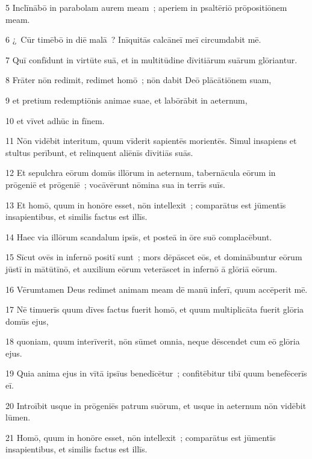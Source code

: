 \psalmVerse
  {\phantom{00}5}
  {Inclīnābō in parabolam aurem meam~; aperiem in psaltēriō prōpositiōnem meam.}


\psalmVerse
  {\phantom{00}6}
  {¿~Cūr timēbō in diē malā~? Inīquitās calcāneī meī circumdabit mē.}


\psalmVerse
  {\phantom{00}7}
  {Quī confīdunt in virtūte suā, et in multitūdine dīvitiārum suārum glōriantur.}


\psalmVerse
  {\phantom{00}8}
  {Frāter nōn redimit, redimet homō~; nōn dabit Deō plācātiōnem suam,}


\psalmVerse
  {\phantom{00}9}
  {et pretium redemptiōnis animae suae, et labōrābit in aeternum,}


\psalmVerse
  {\phantom{0}10}
  {et vīvet adhūc in fīnem.}


\psalmVerse
  {\phantom{0}11}
  {Nōn vidēbit interitum, quum vīderit sapientēs morientēs. Simul insapiens et stultus perībunt, et relinquent aliēnīs dīvitiās suās.}


\psalmVerse
  {\phantom{0}12}
  {Et sepulchra eōrum domūs illōrum in aeternum, tabernācula eōrum in prōgeniē et prōgeniē~; vocāvērunt nōmina sua in terrīs suīs.}


\psalmVerse
  {\phantom{0}13}
  {Et homō, quum in honōre esset, nōn intellexit~; comparātus est jūmentīs insapientibus, et similis factus est illīs.}


\psalmVerse
  {\phantom{0}14}
  {Haec via illōrum scandalum ipsīs, et posteā in ōre suō complacēbunt.}


\psalmVerse
  {\phantom{0}15}
  {Sīcut ovēs in infernō positī sunt~; mors dēpāscet eōs, et dominābuntur eōrum jūstī in mātūtīnō, et auxilium eōrum veterāscet in infernō ā glōriā eōrum.}


\psalmVerse
  {\phantom{0}16}
  {Vērumtamen Deus redimet animam meam dē manū inferī, quum accēperit mē.}


\psalmVerse
  {\phantom{0}17}
  {Nē timuerīs quum dīves factus fuerit homō, et quum multiplicāta fuerit glōria domūs ejus,}


\psalmVerse
  {\phantom{0}18}
  {quoniam, quum interīverit, nōn sūmet omnia, neque dēscendet cum eō glōria ejus.}


\psalmVerse
  {\phantom{0}19}
  {Quia anima ejus in vītā ipsīus benedīcētur~; confitēbitur tibī quum benefēcerīs eī.}


\psalmVerse
  {\phantom{0}20}
  {Introībit usque in prōgeniēs patrum suōrum, et usque in aeternum nōn vidēbit lūmen.}


\psalmVerse
  {\phantom{0}21}
  {Homō, quum in honōre esset, nōn intellexit~; comparātus est jūmentīs insapientibus, et similis factus est illīs.}


